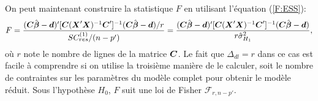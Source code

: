 On peut maintenant construire la statistique $F$ en utilisant l'équation (\ref{F:ESS}):
\begin{equation*}\label{F:lingen}
F={(\bo{C}\hbobeta-\bo{d})'[\bo{C}(\boX'\boX)^{-1}\bo{C}']^{-1}(\bo{C}\hbobeta-\bo{d})/r\over
SC^{(1)}_{res}/(n-p')}={
(\bo{C}\hbobeta-\bo{d})'[\bo{C}(\boX'\boX)^{-1}\bo{C}']^{-1}(\bo{C}\hbobeta-\bo{d})\over
r\hat\sigma^2_{H_1}},
\end{equation*}
où $r$ note le nombre de lignes de la matrice $\bo{C}$.
Le fait que $\Delta_{dl}=r$ dans ce cas est facile \`a comprendre si on utilise la troisième manière de le calculer, soit le nombre de contraintes sur les param\`etres du mod\`ele complet pour
obtenir le mod\`ele réduit. Sous l'hypothèse $H_0$, $F$ suit une loi de Fisher $\mathcal{F}_{r,n-p'}.$





